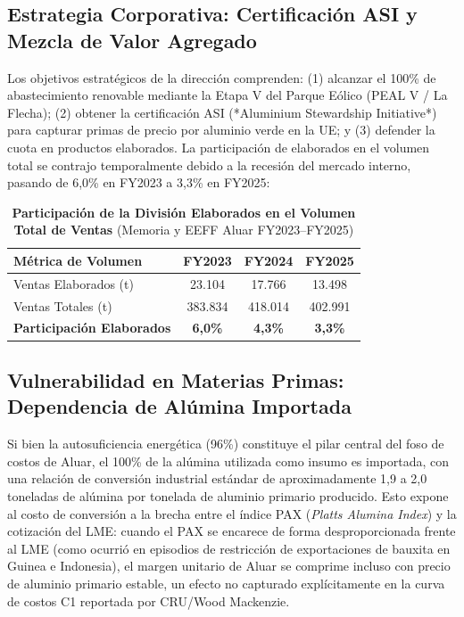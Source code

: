 \documentclass[10pt,a4paper]{article}
\begin{document}
\subsection{Estrategia Corporativa: Certificación ASI y Mezcla de Valor Agregado}
Los objetivos estratégicos de la dirección comprenden: (1) alcanzar el 100\% de abastecimiento renovable mediante la Etapa V del Parque Eólico (PEAL V / La Flecha); (2) obtener la certificación ASI (*Aluminium Stewardship Initiative*) para capturar primas de precio por aluminio verde en la UE; y (3) defender la cuota en productos elaborados. La participación de elaborados en el volumen total se contrajo temporalmente debido a la recesión del mercado interno, pasando de 6,0\% en FY2023 a 3,3\% en FY2025:

\begin{table}[H]
\centering
\caption{\textbf{Participación de la División Elaborados en el Volumen Total de Ventas} {\small\color{gsgray} (Memoria y EEFF Aluar FY2023–FY2025)}}
\small
\begin{tabular}{lccc}
\toprule
\textbf{Métrica de Volumen} & \textbf{FY2023} & \textbf{FY2024} & \textbf{FY2025} \\
\midrule
Ventas Elaborados (t) & 23.104 & 17.766 & 13.498 \\
Ventas Totales (t) & 383.834 & 418.014 & 402.991 \\
\textbf{Participación Elaborados} & \textbf{6,0\%} & \textbf{4,3\%} & \textbf{3,3\%} \\
\bottomrule
\end{tabular}
\end{table}

\subsection{Vulnerabilidad en Materias Primas: Dependencia de Alúmina Importada}
Si bien la autosuficiencia energética (96\%) constituye el pilar central del foso de costos de Aluar, el 100\% de la alúmina utilizada como insumo es importada, con una relación de conversión industrial estándar de aproximadamente 1,9 a 2,0 toneladas de alúmina por tonelada de aluminio primario producido. Esto expone al costo de conversión a la brecha entre el índice PAX (\textit{Platts Alumina Index}) y la cotización del LME: cuando el PAX se encarece de forma desproporcionada frente al LME (como ocurrió en episodios de restricción de exportaciones de bauxita en Guinea e Indonesia), el margen unitario de Aluar se comprime incluso con precio de aluminio primario estable, un efecto no capturado explícitamente en la curva de costos C1 reportada por CRU/Wood Mackenzie.
\end{document}
